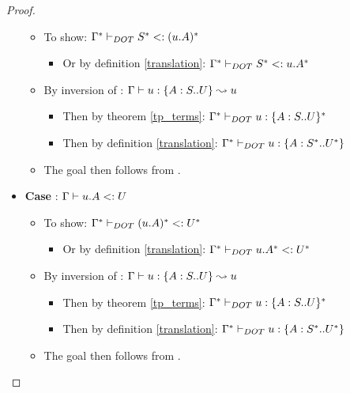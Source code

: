 \begin{proof}
\begin{itemize}
        \begin{itemize}
            \item To show: $\Gamma^{*} \vdash_{DOT} S^{*} <: (u.A)^{*}$
            \begin{itemize}
                \item Or by definition \ref{translation}:
                    $\Gamma^{*} \vdash_{DOT} S^{*} <: u.A^{*}$
            \end{itemize}
            \item By inversion of :
                $\Gamma \vdash u: \{A : S .. U\} \leadsto u$
            \begin{itemize}
                \item Then by theorem \ref{tp_terms}:
                    $\Gamma^{*} \vdash_{DOT} u: \{A : S .. U\}^{*}$
                \item Then by definition \ref{translation}:
                    $\Gamma^{*} \vdash_{DOT} u: \{A : S^{*} .. U^{*}\}$
            \end{itemize}
            \item The goal then follows from .
        \end{itemize}
        \item \textbf{Case} : $\Gamma \vdash u.A <: U$
        \begin{itemize}
            \item To show: $\Gamma^{*} \vdash_{DOT} (u.A)^{*} <: U^{*}$
            \begin{itemize}
                \item Or by definition \ref{translation}:
                    $\Gamma^{*} \vdash_{DOT} u.A^{*} <: U^{*}$
            \end{itemize}
            \item By inversion of :
                $\Gamma \vdash u: \{A : S .. U\} \leadsto u$
            \begin{itemize}
                \item Then by theorem \ref{tp_terms}:
                    $\Gamma^{*} \vdash_{DOT} u: \{A : S .. U\}^{*}$
                \item Then by definition \ref{translation}:
                    $\Gamma^{*} \vdash_{DOT} u: \{A : S^{*} .. U^{*}\}$
            \end{itemize}
            \item The goal then follows from .
        \end{itemize}

\end{itemize}
\end{proof}
